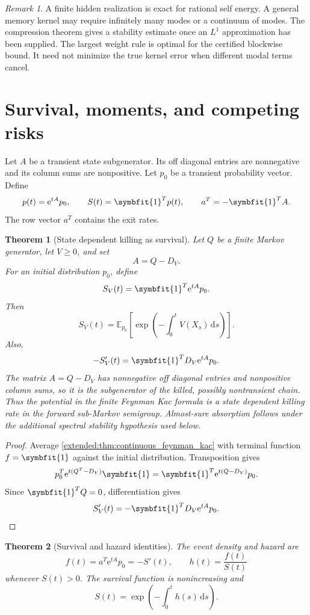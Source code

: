 \documentclass[11pt,letterpaper]{article}
\newtheorem{theorem}{Theorem}[section]
\theoremstyle{plain}
\theoremstyle{plain}
\theoremstyle{plain}
\theoremstyle{definition}
\theoremstyle{definition}
\theoremstyle{definition}
\theoremstyle{definition}
\theoremstyle{definition}
\theoremstyle{remark}
\theoremstyle{remark}
\newtheorem{remark}[remark]{Remark}
\theoremstyle{remark}
\theoremstyle{remark}
\theoremstyle{remark}
\newcommand{\Exp}{\mathbb E}
\theoremstyle{remark}
\newcommand{\e}{\mathrm e}
\newcommand{\one}{\bm 1}
\newcommand{\dd}{\,\mathrm d}
\providecommand{\bm}[1]{\symbfit{#1}}
\let\KomorebiPrimitivemathbb\mathbb
\renewcommand{\mathbb}[1]{{\KomorebiPrimitivemathbb{#1}}}
\let\KomorebiPrimitivemathrm\mathrm
\renewcommand{\mathrm}[1]{{\KomorebiPrimitivemathrm{#1}}}
\begin{document}
\begin{remark}\label{extended:record:096}
A finite hidden realization is exact for rational self energy. A general memory kernel may require infinitely many modes or a continuum of modes. The compression theorem gives a stability estimate once an \(L^1\) approximation has been supplied. The largest weight rule is optimal for the certified blockwise bound. It need not minimize the true kernel error when different modal terms cancel.
\end{remark}

\FloatBarrier
\section{Survival, moments, and competing risks}\label{extended:section:16}\label{extended:sec:survival}

Let \(A\) be a transient state subgenerator. Its off diagonal entries are nonnegative and its column sums are nonpositive. Let \(p_0\) be a transient probability vector. Define
\[
p(t)=\e^{tA}p_0,
\qquad
S(t)=\one^Tp(t),
\qquad
a^T=-\one^TA.
\]
The row vector \(a^T\) contains the exit rates.

\begin{theorem}[State dependent killing as survival]\label{extended:record:097}\label{extended:thm:killing_survival}
Let \(Q\) be a finite Markov generator, let \(V\geq0\), and set
\[
A=Q-D_V.
\]
For an initial distribution \(p_0\), define
\[
S_V(t)=\one^T\e^{tA}p_0.
\]
Then
\[
S_V(t)
=
\Exp_{p_0}
\left[
\exp\left(
-\int_0^tV(X_s)\dd s
\right)
\right].
\]
Also,
\[
-S_V'(t)
=
\one^TD_V\e^{tA}p_0.
\]
The matrix \(A=Q-D_V\) has nonnegative off diagonal entries and nonpositive column sums, so it is the subgenerator of the killed, possibly nontransient chain. Thus the potential in the finite Feynman Kac formula is a state dependent killing rate in the forward sub-Markov semigroup. Almost-sure absorption follows under the additional spectral stability hypothesis used below.
\end{theorem}

\begin{proof}
Average \cref{extended:thm:continuous_feynman_kac} with terminal function \(f=\one\) against the initial distribution. Transposition gives
\[
p_0^T\e^{t(Q^T-D_V)}\one
=
\one^T\e^{t(Q-D_V)}p_0.
\]
Since \(\one^TQ=0\), differentiation gives
\[
S_V'(t)
=
-\one^TD_V\e^{tA}p_0.
\]
\end{proof}

\begin{theorem}[Survival and hazard identities]\label{extended:record:098}\label{extended:thm:survival_hazard}
The event density and hazard are
\[
f(t)=a^T\e^{tA}p_0=-S'(t),
\qquad
h(t)=\frac{f(t)}{S(t)}
\]
whenever \(S(t)>0\). The survival function is nonincreasing and
\[
S(t)
=
\exp\left(
-\int_0^th(s)\dd s
\right).
\]
\end{theorem}
\end{document}
